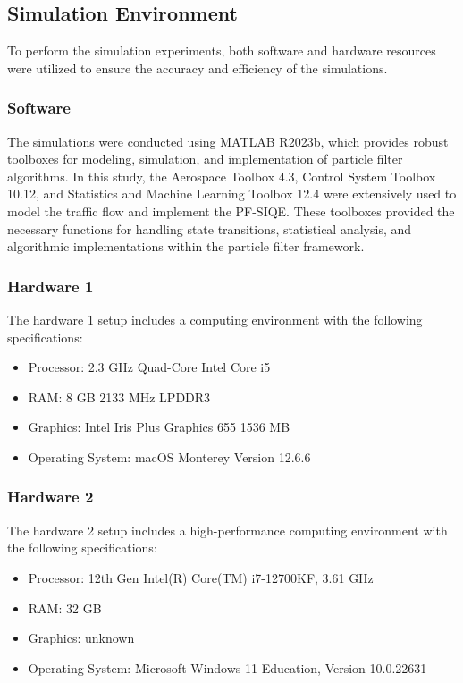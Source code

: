 \subsection{Simulation Environment}
To perform the simulation experiments, both software and hardware resources were utilized to ensure the accuracy and efficiency of the simulations.

\subsubsection{Software}
The simulations were conducted using MATLAB R2023b, which provides robust toolboxes for modeling, simulation, and implementation of particle filter algorithms. In this study, the Aerospace Toolbox 4.3, Control System Toolbox 10.12, and Statistics and Machine Learning Toolbox 12.4 were extensively used to model the traffic flow and implement the PF-SIQE. These toolboxes provided the necessary functions for handling state transitions, statistical analysis, and algorithmic implementations within the particle filter framework.


\subsubsection{Hardware 1}
The hardware 1 setup includes a computing environment with the following specifications:
\begin{itemize}
\item Processor: 2.3 GHz Quad-Core Intel Core i5
\item RAM: 8 GB 2133 MHz LPDDR3
\item Graphics: Intel Iris Plus Graphics 655 1536 MB
\item Operating System: macOS Monterey Version 12.6.6
\end{itemize}

\subsubsection{Hardware 2}
The hardware 2 setup includes a high-performance computing environment with the following specifications:
\begin{itemize}
\item Processor: 12th Gen Intel(R) Core(TM) i7-12700KF, 3.61 GHz
\item RAM: 32 GB
\item Graphics: unknown
\item Operating System: Microsoft Windows 11 Education, Version 10.0.22631
\end{itemize}

